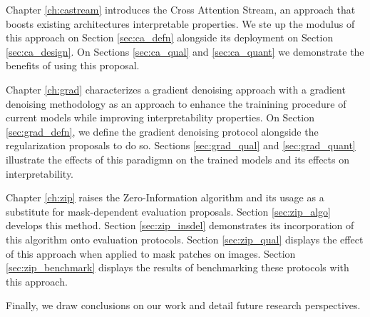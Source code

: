 Chapter \ref{ch:castream} introduces the Cross Attention Stream, an approach that boosts existing 
architectures interpretable properties. We ste up the modulus of this approach on 
Section \ref{sec:ca_defn} alongside its deployment on Section \ref{sec:ca_design}. 
On Sections \ref{sec:ca_qual} and \ref{sec:ca_quant} we demonstrate the benefits of using this
proposal.

Chapter \ref{ch:grad} characterizes a gradient denoising approach with a gradient denoising 
methodology as an approach to enhance the trainining procedure of current models while improving 
interpretability properties. On Section \ref{sec:grad_defn}, we define the gradient denoising 
protocol alongside the regularization proposals to do so.
Sections \ref{sec:grad_qual} and \ref{sec:grad_quant} illustrate the effects of this paradigmn
on the trained models and its effects on interpretability.

Chapter \ref{ch:zip} raises the Zero-Information algorithm and its usage as a substitute
for mask-dependent evaluation proposals. Section \ref{sec:zip_algo} develops this 
method. Section \ref{sec:zip_insdel} demonstrates its incorporation of this 
algorithm onto evaluation protocols. Section \ref{sec:zip_qual} displays
the effect of this approach when applied to mask patches on images. Section 
\ref{sec:zip_benchmark} displays the results of benchmarking these protocols 
with this approach. 
    
Finally, we draw conclusions on our work and detail future research perspectives.